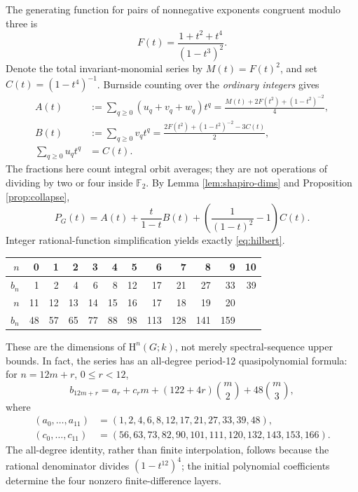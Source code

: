 \documentclass[11pt,a4paper]{article}
\theoremstyle{remark}\newtheorem{remark}[theorem]{Remark}
\newcommand{\F}{\mathbb F}
\newcommand{\HH}{\mathrm H}
\begin{document}
The generating function for pairs of nonnegative exponents congruent modulo three is
\[F(t)=\frac{1+t^2+t^4}{(1-t^3)^2}.\]
Denote the total invariant-monomial series by \(M(t)=F(t)^2\), and set \(C(t)=(1-t^4)^{-1}\). Burnside counting over the \emph{ordinary integers} gives
\begin{align*}
A(t)&:=\sum_{q\ge0}(u_q+v_q+w_q)t^q
=\frac{M(t)+2F(t^2)+(1-t^2)^{-2}}4,\\
B(t)&:=\sum_{q\ge0}v_qt^q
=\frac{2F(t^2)+(1-t^2)^{-2}-3C(t)}2,\\
\sum_{q\ge0}u_qt^q&=C(t).
\end{align*}
The fractions here count integral orbit averages; they are not operations of dividing by two or four inside \(\F_2\). By Lemma \ref{lem:shapiro-dims} and Proposition \ref{prop:collapse},
\[
P_G(t)=A(t)+\frac{t}{1-t}B(t)+\left(\frac1{(1-t)^2}-1\right)C(t).
\]
Integer rational-function simplification yields exactly \eqref{eq:hilbert}.

\begin{center}
\small
\begin{tabular}{@{}r|rrrrrrrrrrr@{}}
\toprule
\(n\) &0&1&2&3&4&5&6&7&8&9&10\\ \midrule
\(b_n\)&1&2&4&6&8&12&17&21&27&33&39\\
\midrule
\(n\) &11&12&13&14&15&16&17&18&19&20&\\ \midrule
\(b_n\)&48&57&65&77&88&98&113&128&141&159&\\
\bottomrule
\end{tabular}
\end{center}
These are the dimensions of \(\HH^n(G;k)\), not merely spectral-sequence upper bounds. In fact, the series has an all-degree period-12 quasipolynomial formula: for \(n=12m+r\), \(0\le r<12\),
\begin{equation}\label{eq:quasi}
 b_{12m+r}=a_r+c_rm+(122+4r)\binom m2+48\binom m3,
\end{equation}
where
\begin{align*}
(a_0,\dots,a_{11})&=(1,2,4,6,8,12,17,21,27,33,39,48),\\
(c_0,\dots,c_{11})&=(56,63,73,82,90,101,111,120,132,143,153,166).
\end{align*}
The all-degree identity, rather than finite interpolation, follows because the rational denominator divides \((1-t^{12})^4\); the initial polynomial coefficients determine the four nonzero finite-difference layers.
\end{document}
